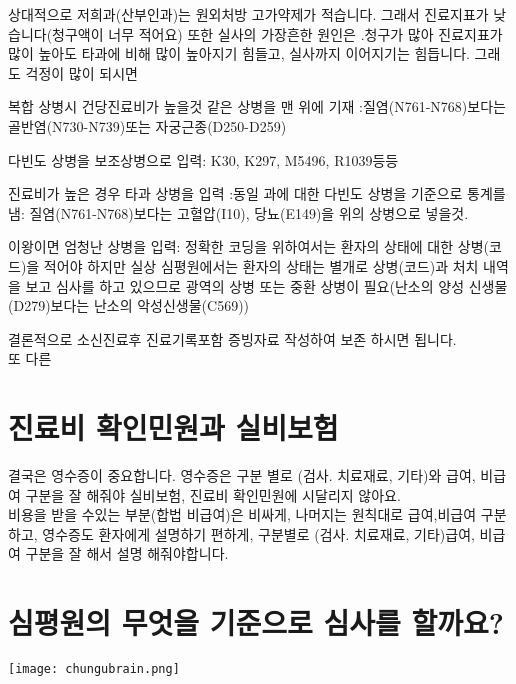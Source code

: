 \begin{shaded}
상대적으로 저희과(산부인과)는 원외처방 고가약제가 적습니다. 그래서 진료지표가 낮습니다(청구액이 너무 적어요)
또한 실사의 가장흔한 원인은 .청구가 많아 진료지표가 많이 높아도 타과에 비해 많이 높아지기 힘들고, 실사까지 이어지기는 힘듭니다.  그래도 걱정이 많이 되시면
\begin{description}\tightlist
\item[해결책1.] 복합 상병시 건당진료비가 높을것 같은 상병을 맨 위에 기재 :질염(N761-N768)보다는 골반염(N730-N739)또는 자궁근종(D250-D259) 
\item[해결책2.] 다빈도 상병을 보조상병으로 입력: K30, K297, M5496, R1039등등
\item[해결책3.] 진료비가 높은 경우 타과 상병을 입력 :동일 과에 대한 다빈도 상병을 기준으로 통계를 냄: 질염(N761-N768)보다는 고혈압(I10), 당뇨(E149)을 위의 상병으로 넣을것.
\item[해결책4.] 이왕이면 엄청난 상병을 입력: 정확한 코딩을 위하여서는 환자의 상태에 대한 상병(코드)을 적어야 하지만 실상 심평원에서는 환자의 상태는 별개로 상병(코드)과 
  처치 내역을 보고 심사를 하고 있으므로 광역의  상병 또는 중환 상병이 필요(난소의 양성 신생물(D279)보다는 난소의 악성신생물(C569))
\end{description}
결론적으로 소신진료후 진료기록포함 증빙자료 작성하여 보존 하시면 됩니다.\\
또 다른 
\end{shaded}
\clearpage
\section{진료비 확인민원과 실비보험}
결국은 영수증이 중요합니다. 영수증은 구분 별로 (검사. 치료재료, 기타)와 급여, 비급여 구분을 잘 해줘야 실비보험, 진료비 확인민원에 시달리지 않아요.\\
비용을 받을 수있는 부분(합법 비급여)은 비싸게, 나머지는 원칙대로 급여,비급여 구분하고, 영수증도 환자에게 설명하기 편하게, 구분별로 (검사. 치료재료, 기타)급여, 비급여 구분을 잘 해서 설명 해줘야합니다.
\clearpage

\section{심평원의 무엇을 기준으로 심사를 할까요?}
\begin{center}
\texttt{[image: chungubrain.png]}
\end{center}

